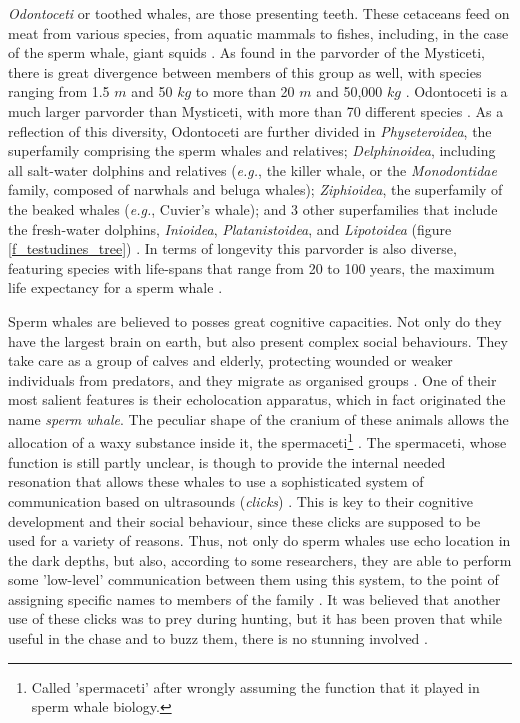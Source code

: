 \textsl{Odontoceti} or toothed whales, are those presenting teeth.
These cetaceans feed on meat from various species, from aquatic mammals to fishes, including, in the case of the sperm whale, giant squids \cite{Best1979}.
As found in the parvorder of the Mysticeti, there is great divergence between members of this group as well, with species ranging from 1.5 $m$ and 50 $kg$ to more than 20 $m$ and 50,000 $kg$ \cite{Warren2017a}.
Odontoceti is a much larger parvorder than Mysticeti, with more than 70 different species \cite{Agnarsson2008}.
As a reflection of this diversity, Odontoceti are further divided in \textsl{Physeteroidea}, the superfamily comprising the sperm whales and relatives; \textsl{Delphinoidea}, including all salt-water dolphins and relatives (\textit{e.g.}, the killer whale, or the \textsl{Monodontidae} family, composed of narwhals and beluga whales); \textsl{Ziphioidea}, the superfamily of the beaked whales (\textit{e.g.}, Cuvier's whale); and 3 other superfamilies that include the fresh-water dolphins, \textsl{Inioidea}, \textsl{Platanistoidea}, and \textsl{Lipotoidea} (figure \ref{f_testudines_tree}) \cite{Agnarsson2008}.
In terms of longevity this parvorder is also diverse, featuring species with life-spans that range from 20 to 100 years, the maximum life expectancy for a sperm whale \cite{Whitehead2003}.

Sperm whales are believed to posses great cognitive capacities.
Not only do they have the largest brain on earth, but also present complex social behaviours.
They take care as a group of calves and elderly, protecting wounded or weaker individuals from predators, and they migrate as organised groups \cite{Best1979}.
One of their most salient features is their echolocation apparatus, which in fact originated the name \emph{sperm whale}.
The peculiar shape of the cranium of these animals allows the allocation of a waxy substance inside it, the spermaceti\footnote{Called 'spermaceti' after wrongly assuming the function that it played in sperm whale biology.} \cite{Alam2016,Clarke1970}.
The spermaceti, whose function is still partly unclear, is though to provide the internal needed resonation that allows these whales to use a sophisticated system of communication based on ultrasounds (\emph{clicks}) \cite{Mohl2001}.
This is key to their cognitive development and their social behaviour, since these clicks are supposed to be used for a variety of reasons.
Thus, not only do sperm whales use echo location in the dark depths, but also, according to some researchers, they are able to perform some 'low-level' communication between them using this system, to the point of assigning specific names to members of the family \cite{Schulz2011}.
It was believed that another use of these clicks was to  prey during hunting, but it has been  proven that while useful in the chase and to buzz them, there is no stunning involved \cite{Fais2016}.

